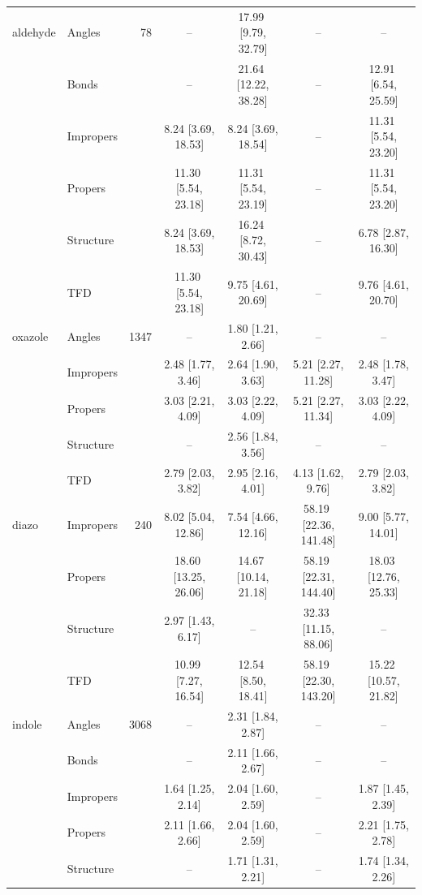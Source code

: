 \begin{longtable}[c]{ ll | r | c c c c}
    aldehyde & Angles & 78 & -- & 17.99\,\,[9.79, 32.79] & -- & -- \\
     & Bonds &  & -- & 21.64\,\,[12.22, 38.28] & -- & 12.91\,\,[6.54, 25.59] \\
     & Impropers &  & 8.24\,\,[3.69, 18.53] & 8.24\,\,[3.69, 18.54] & -- & 11.31\,\,[5.54, 23.20] \\
     & Propers &  & 11.30\,\,[5.54, 23.18] & 11.31\,\,[5.54, 23.19] & -- & 11.31\,\,[5.54, 23.20] \\
     & Structure &  & 8.24\,\,[3.69, 18.53] & 16.24\,\,[8.72, 30.43] & -- & 6.78\,\,[2.87, 16.30] \\
     & TFD &  & 11.30\,\,[5.54, 23.18] & 9.75\,\,[4.61, 20.69] & -- & 9.76\,\,[4.61, 20.70] \\
    \hline
    oxazole & Angles & 1347 & -- & 1.80\,\,[1.21, 2.66] & -- & -- \\
     & Impropers &  & 2.48\,\,[1.77, 3.46] & 2.64\,\,[1.90, 3.63] & 5.21\,\,[2.27, 11.28] & 2.48\,\,[1.78, 3.47] \\
     & Propers &  & 3.03\,\,[2.21, 4.09] & 3.03\,\,[2.22, 4.09] & 5.21\,\,[2.27, 11.34] & 3.03\,\,[2.22, 4.09] \\
     & Structure &  & -- & 2.56\,\,[1.84, 3.56] & -- & -- \\
     & TFD &  & 2.79\,\,[2.03, 3.82] & 2.95\,\,[2.16, 4.01] & 4.13\,\,[1.62, 9.76] & 2.79\,\,[2.03, 3.82] \\
    \hline
    diazo & Impropers & 240 & 8.02\,\,[5.04, 12.86] & 7.54\,\,[4.66, 12.16] & 58.19\,\,[22.36, 141.48] & 9.00\,\,[5.77, 14.01] \\
     & Propers &  & 18.60\,\,[13.25, 26.06] & 14.67\,\,[10.14, 21.18] & 58.19\,\,[22.31, 144.40] & 18.03\,\,[12.76, 25.33] \\
     & Structure &  & 2.97\,\,[1.43, 6.17] & -- & 32.33\,\,[11.15, 88.06] & -- \\
     & TFD &  & 10.99\,\,[7.27, 16.54] & 12.54\,\,[8.50, 18.41] & 58.19\,\,[22.30, 143.20] & 15.22\,\,[10.57, 21.82] \\
    \hline
    indole & Angles & 3068 & -- & 2.31\,\,[1.84, 2.87] & -- & -- \\
     & Bonds &  & -- & 2.11\,\,[1.66, 2.67] & -- & -- \\
     & Impropers &  & 1.64\,\,[1.25, 2.14] & 2.04\,\,[1.60, 2.59] & -- & 1.87\,\,[1.45, 2.39] \\
     & Propers &  & 2.11\,\,[1.66, 2.66] & 2.04\,\,[1.60, 2.59] & -- & 2.21\,\,[1.75, 2.78] \\
     & Structure &  & -- & 1.71\,\,[1.31, 2.21] & -- & 1.74\,\,[1.34, 2.26] \\

\end{longtable}
